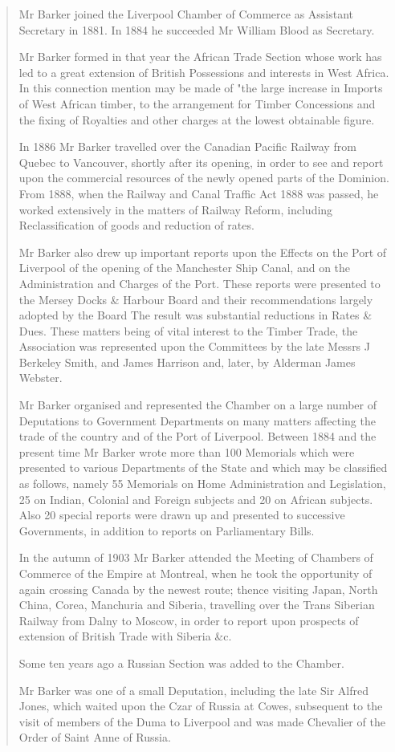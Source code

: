 \begin{quotation}
Mr Barker joined the Liverpool Chamber of Commerce as Assistant Secretary in 1881. In 1884 he succeeded Mr William Blood as Secretary.

Mr Barker formed in that year the African Trade Section whose work has led to a great extension of British Possessions and interests in West Africa. In this connection mention may be made of "the large increase in Imports of West African timber, to the arrangement for Timber Concessions and the fixing of Royalties and other charges at the lowest obtainable figure.

In 1886 Mr Barker travelled over the Canadian Pacific Railway from Quebec to Vancouver, shortly after its opening, in order to see and report upon the commercial resources of the newly opened parts of the Dominion. From 1888, when the Railway and Canal Traffic Act 1888 was passed, he worked extensively in the matters of Railway Reform, including Reclassification of goods and reduction of rates.

Mr Barker also drew up important reports upon the Effects on the Port of Liverpool of the opening of the Manchester Ship Canal, and on the Administration and Charges of the Port. These reports were presented to the Mersey Docks \& Harbour Board and their recommendations largely adopted by the Board The result was substantial reductions in Rates \& Dues. These matters being of vital interest to the Timber Trade, the Association was represented upon the Committees by the late Messrs J Berkeley Smith, and James Harrison and, later, by Alderman James Webster.

Mr Barker organised and represented the Chamber on a large number of Deputations to Government Departments on many matters affecting the trade of the country and of the Port of Liverpool. Between 1884 and the present time Mr Barker wrote more than 100 Memorials which were presented to various Departments of the State and which may be classified as follows, namely 55 Memorials on Home Administration and Legislation, 25 on Indian, Colonial and Foreign subjects and 20 on African subjects. Also 20 special reports were drawn up and presented to successive Governments, in addition to reports on Parliamentary Bills.

In the autumn of 1903 Mr Barker attended the Meeting of Chambers of Commerce of the Empire at Montreal, when he took the opportunity of again crossing Canada by the newest route; thence visiting Japan, North China, Corea, Manchuria and Siberia, travelling over the Trans Siberian Railway from Dalny to Moscow, in order to report upon prospects of extension of British Trade with Siberia \&c.

Some ten years ago a Russian Section was added to the Chamber.

Mr Barker was one of a small Deputation, including the late Sir Alfred Jones, which waited upon the Czar of Russia at Cowes, subsequent to the visit of members of the Duma to Liverpool and was made Chevalier of the Order of Saint Anne of Russia.
\end{quotation}


